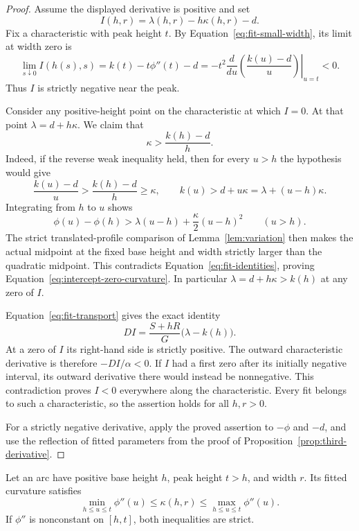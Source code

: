 \begin{proof}
Assume the displayed derivative is positive and set
\[
 I(h,r)=\lambda(h,r)-h\kappa(h,r)-d.
\]
Fix a characteristic with peak height $t$.  By
Equation~\eqref{eq:fit-small-width}, its limit at width zero is
\[
 \lim_{s\downarrow0}I(h(s),s)
 =k(t)-t\phi''(t)-d
 =-t^2\left.\frac{d}{du}\left(\frac{k(u)-d}{u}\right)\right|_{u=t}
 <0.
\]
Thus $I$ is strictly negative near the peak.

Consider any positive-height point on the characteristic at which
$I=0$.  At that point $\lambda=d+h\kappa$.  We claim that
\begin{equation}\label{eq:intercept-zero-curvature}
 \kappa>\frac{k(h)-d}{h}.
\end{equation}
Indeed, if the reverse weak inequality held, then for every $u>h$
the hypothesis would give
\[
 \frac{k(u)-d}{u}>\frac{k(h)-d}{h}\ge\kappa,
 \qquad
 k(u)>d+u\kappa=\lambda+(u-h)\kappa.
\]
Integrating from $h$ to $u$ shows
\[
 \phi(u)-\phi(h)
   >\lambda(u-h)+\frac{\kappa}{2}(u-h)^2
 \qquad(u>h).
\]
The strict translated-profile comparison of Lemma~\ref{lem:variation}
then makes the actual midpoint at the fixed base height and width
strictly larger than the quadratic midpoint.  This contradicts
Equation~\eqref{eq:fit-identities}, proving
Equation~\eqref{eq:intercept-zero-curvature}.  In particular
$\lambda=d+h\kappa>k(h)$ at any zero of $I$.

Equation~\eqref{eq:fit-transport} gives the exact identity
\begin{equation}\label{eq:intercept-transport}
 DI=\frac{S+hR}{G}\bigl(\lambda-k(h)\bigr).
\end{equation}
At a zero of $I$ its right-hand side is strictly positive.  The
outward characteristic derivative is therefore $-DI/\alpha<0$.
If $I$ had a first zero after its initially negative interval, its
outward derivative there would instead be nonnegative.  This
contradiction proves $I<0$ everywhere along the characteristic.
Every fit belongs to such a characteristic, so the assertion holds
for all $h,r>0$.

For a strictly negative derivative, apply the proved assertion to
$-\phi$ and $-d$, and use the reflection of fitted parameters from
the proof of Proposition~\ref{prop:third-derivative}.
\end{proof}

\begin{lemma}\label{lem:fitted-curvature-range}
Let an arc have positive base height $h$, peak height $t>h$, and
width $r$.  Its fitted curvature satisfies
\begin{equation}\label{eq:fitted-curvature-range}
 \min_{h\le u\le t}\phi''(u)
       \le\kappa(h,r)\le
 \max_{h\le u\le t}\phi''(u).
\end{equation}
If $\phi''$ is nonconstant on $[h,t]$, both inequalities are strict.
\end{lemma}

